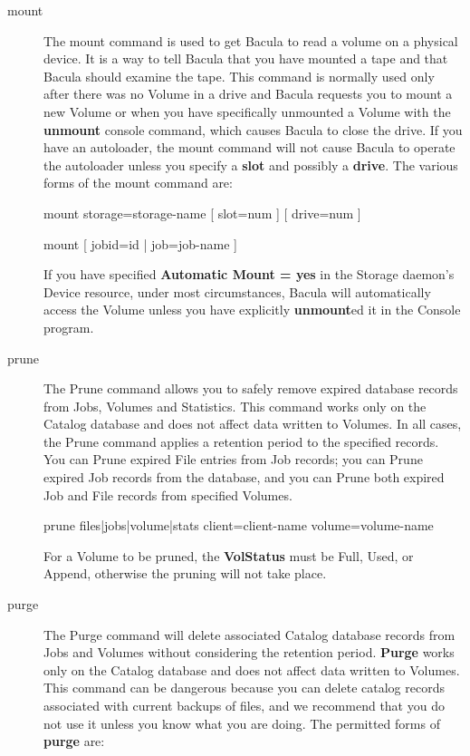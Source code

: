 \begin{description}
\item [mount]
   The mount command is used to get Bacula to read a volume on a physical
   device.  It is a way to tell Bacula that you have mounted a tape and
   that Bacula should examine the tape.  This command is normally
   used only after there was no Volume in a drive and Bacula requests you to mount a new
   Volume or when you have specifically unmounted a Volume with the {\bf
   unmount} console command, which causes Bacula to close the drive.  If
   you have an autoloader, the mount command will not cause Bacula to
   operate the autoloader unless you specify a {\bf slot} and possibly a
   {\bf drive}. The various forms of the mount command are:

mount  storage=\lt{}storage-name\gt{} [ slot=\lt{}num\gt{} ] [
       drive=\lt{}num\gt{} ]

mount [ jobid=\lt{}id\gt{} |  job=\lt{}job-name\gt{} ]

   If you have specified {\bf Automatic  Mount = yes} in the Storage daemon's
   Device resource,  under most circumstances, Bacula will automatically access 
   the Volume unless you have explicitly {\bf unmount}ed it in  the Console
   program. 

\label{ManualPruning}
\item [prune]
   The Prune command allows you to safely remove expired database records from
   Jobs, Volumes and Statistics.  This command works only on the Catalog
   database and does not affect data written to Volumes.  In all cases, the
   Prune command applies a retention period to the specified records.  You can
   Prune expired File entries from Job records; you can Prune expired Job
   records from the database, and you can Prune both expired Job and File
   records from specified Volumes.

prune files|jobs|volume|stats client=\lt{}client-name\gt{} 
volume=\lt{}volume-name\gt{}  

   For a Volume to be pruned, the {\bf VolStatus} must be Full, Used, or
   Append, otherwise the pruning will not take place.

\item [purge]
   The Purge command will delete associated Catalog database records from
   Jobs and Volumes without considering the retention period.  {\bf Purge}
   works only on the Catalog database and does not affect data written to
   Volumes.  This command can be dangerous because you can delete catalog
   records associated with current backups of files, and we recommend that
   you do not use it unless you know what you are doing.  The permitted
   forms of {\bf purge} are:


\end{description}
